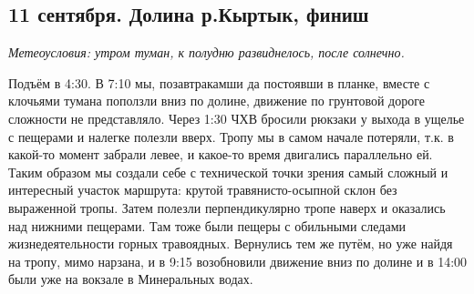 \subsection{11 сентября. Долина р.Кыртык, финиш}
\textit{Метеоусловия: утром туман, к полудню развиднелось, после солнечно.}


Подъём в 4:30. В 7:10 мы, позавтракамши да постоявши в планке, вместе с клочьями тумана поползли вниз по долине, движение по грунтовой дороге сложности не представляло. Через 1:30 ЧХВ бросили рюкзаки у выхода в ущелье с пещерами и налегке полезли вверх. Тропу мы в самом начале потеряли, т.к. в какой-то момент забрали левее, и какое-то время двигались параллельно ей. Таким образом мы создали себе с технической точки зрения самый сложный и интересный участок маршрута: крутой травянисто-осыпной склон без выраженной тропы. Затем полезли перпендикулярно тропе наверх и оказались над нижними пещерами. Там тоже были пещеры с обильными следами жизнедеятельности горных травоядных. Вернулись тем же путём, но уже найдя на тропу, мимо нарзана, и в 9:15 возобновили движение вниз по долине и в 14:00 были уже на вокзале в Минеральных водах. 

\clearpage
